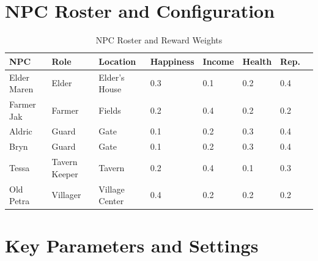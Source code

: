 \documentclass[12pt, a4paper, oneside]{report}
\begin{document}
\section{NPC Roster and Configuration}
\label{sec:npc-roster}

\begin{table}[H]
\centering
\caption{NPC Roster and Reward Weights}
\label{tab:npc_roster}
\begin{tabular}{llllllll}
\toprule
\textbf{NPC} & \textbf{Role} & \textbf{Location} & \textbf{Happiness} & \textbf{Income} & \textbf{Health} & \textbf{Rep.} \\
\midrule
Elder Maren & Elder & Elder's House & 0.3 & 0.1 & 0.2 & 0.4 \\
Farmer Jak & Farmer & Fields & 0.2 & 0.4 & 0.2 & 0.2 \\
Aldric & Guard & Gate & 0.1 & 0.2 & 0.3 & 0.4 \\
Bryn & Guard & Gate & 0.1 & 0.2 & 0.3 & 0.4 \\
Tessa & Tavern Keeper & Tavern & 0.2 & 0.4 & 0.1 & 0.3 \\
Old Petra & Villager & Village Center & 0.4 & 0.2 & 0.2 & 0.2 \\
\bottomrule
\end{tabular}
\end{table}

\section{Key Parameters and Settings}
\label{sec:parameters}
\end{document}
